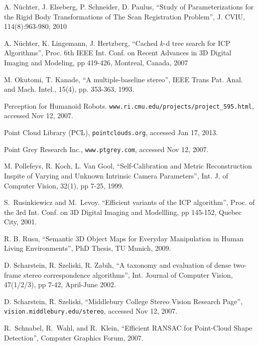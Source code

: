 \documentclass[twocolumn,oneside]{book}
\begin{document}
\begin{thebibliography}{99}
A. N{\"u}chter, J. Elseberg, P. Schneider, D. Paulus,
``Study of Parameterizations for the Rigid Body Transformations of The Scan Registration Problem'',
J. CVIU, 114(8):963-980, 2010

A. N{\"u}chter, K. Lingemann, J. Hertzberg,
``Cached $k$-d tree search for ICP Algorithms'',
Proc. 6th IEEE Int. Conf. on Recent Advances in 3D Digital Imaging and Modeling,
pp 419-426, Montreal, Canada, 2007

M. Okutomi, T. Kanade,
``A multiple-baseline stereo'',
IEEE Trans Pat. Anal. and Mach. Intel., 15(4), pp. 353-363, 1993.


Perception for Humanoid Robots.
\verb+www.ri.cmu.edu/projects/project_595.html+, accessed Nov 12, 2007.

Point Cloud Library (PCL),
\verb+pointclouds.org+, accessed Jan 17, 2013.

Point Grey Research Inc.,
\verb+www.ptgrey.com+, accessed Nov 12, 2007.

M. Pollefeys, R. Koch, L. Van Gool,
``Self-Calibration and Metric Reconstruction Inspite of Varying and Unknown Intrinsic Camera Parameters'',
Int. J. of Computer Vision, 32(1), pp 7-25, 1999.

S.~Rusinkiewicz and M.~Levoy.
``Efficient variants of the {ICP} algorithm'',
Proc. of the 3rd Int. Conf. on 3D Digital Imaging and Modellling, pp 145-152,
Quebec City, 2001.

R. B. Rusu,
``Semantic 3D Object Maps for Everyday Manipulation in Human Living Environments'',
PhD Thesis, TU Munich, 2009.

D. Scharstein, R. Szeliski, R. Zabih,
``A taxonomy and evaluation of dense two-frame stereo correspondence algorithms'',
Int. Journal of Computer Vision, 47(1/2/3), pp 7-42, April-June 2002.

D. Scharstein, R. Szeliski,
``Middlebury College Stereo Vision Research Page'',
\verb+vision.middlebury.edu/stereo+, accessed Nov 12, 2007.

R.~Schnabel, R.~Wahl, and R.~Klein,
``Efficient RANSAC for Point-Cloud Shape Detection'',
Computer Graphics Forum, 2007.


\end{thebibliography}
\end{document}
